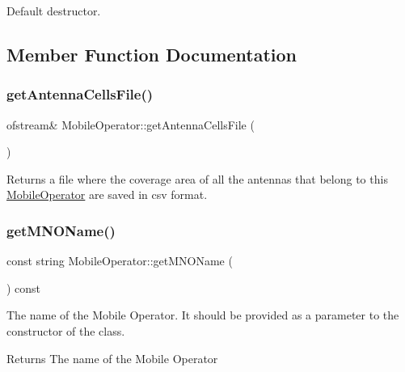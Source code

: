 Default destructor. 

\subsection{Member Function Documentation}
\mbox{\label{class_mobile_operator_ae6aa3043d946fa97eba7032b9707e52a}} 
\subsubsection{\texorpdfstring{get\+Antenna\+Cells\+File()}{getAntennaCellsFile()}}
{\footnotesize\ttfamily ofstream\& Mobile\+Operator\+::get\+Antenna\+Cells\+File (\begin{DoxyParamCaption}{ }\end{DoxyParamCaption})}

\begin{DoxyReturn}{Returns}
a file where the coverage area of all the antennas that belong to this \hyperlink{class_mobile_operator}{Mobile\+Operator} are saved in csv format. 
\end{DoxyReturn}
\mbox{\label{class_mobile_operator_a003a5d91f543eaf5ff11894bd462ac77}} 
\subsubsection{\texorpdfstring{get\+M\+N\+O\+Name()}{getMNOName()}}
{\footnotesize\ttfamily const string Mobile\+Operator\+::get\+M\+N\+O\+Name (\begin{DoxyParamCaption}{ }\end{DoxyParamCaption}) const}

The name of the Mobile Operator. It should be provided as a parameter to the constructor of the class. \begin{DoxyReturn}{Returns}
The name of the Mobile Operator 
\end{DoxyReturn}
\mbox{\label{class_mobile_operator_a2b4538d96f7aa898e6e470411d40cbf7}} 

